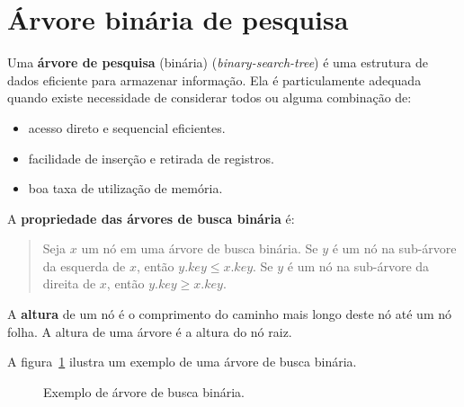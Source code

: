 \section{Árvore binária de pesquisa}

Uma {\bf árvore de pesquisa} (binária) (\emph{binary-search-tree}) é uma
estrutura de dados eficiente para armazenar informação.
Ela é particulamente adequada quando existe necessidade de considerar todos
ou alguma combinação de:
\begin{itemize}
\item acesso direto e sequencial eficientes.
\item facilidade de inserção e retirada de registros.
\item boa taxa de utilização de memória.
\end{itemize}

A {\bf propriedade das árvores de busca binária} é:
\begin{quote}
Seja $x$ um nó em uma árvore de busca binária.
Se $y$ é um nó na sub-árvore da esquerda de $x$, então $y.key \leq x.key$.
Se $y$ é um nó na sub-árvore da direita de $x$, então $y.key \geq x.key$.
\end{quote}

A {\bf altura} de um nó é o comprimento do caminho mais longo deste nó até um
nó folha.
A altura de uma árvore é a altura do nó raiz.

A figura~\ref{aula05:fig:arv} ilustra um exemplo de uma árvore de busca binária.
\begin{figure}[!htb]
\centering
{}
\caption{Exemplo de árvore de busca binária.}
\label{aula05:fig:arv}
\end{figure}

